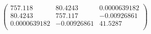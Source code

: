 \documentclass{article}
\begin{document}
\[\left(
\begin{array}{ccc}
 757.118 & 80.4243 & 0.0000639182 \\
 80.4243 & 757.117 & -0.00926861 \\
 0.0000639182 & -0.00926861 & 41.5287 \\
\end{array}
\right)\]
\end{document}
